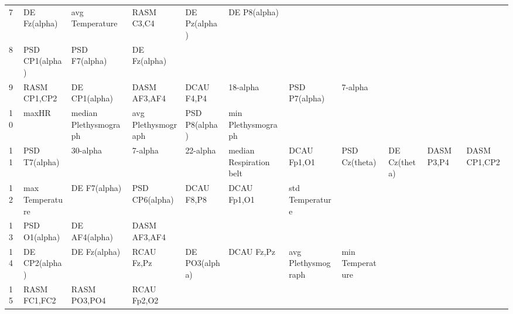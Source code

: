 \begin{landscape}
\begin{table}[]
\begin{tabular}{l|llllllll}
7        & DE Fz(alpha)          & avg Temperature       & RASM C3,C4           & DE Pz(alpha)            & DE P8(alpha)            &                      &                      &                       &                       &                    \\
8        & PSD CP1(alpha)        & PSD F7(alpha)         & DE Fz(alpha)         &                         &                         &                      &                      &                       &                       &                    \\
9        & RASM CP1,CP2          & DE CP1(alpha)         & DASM AF3,AF4         & DCAU F4,P4              & 18-alpha                & PSD P7(alpha)        & 7-alpha              &                       &                       &                    \\
10       & maxHR                 & median Plethysmograph & avg Plethysmograph   & PSD P8(alpha)           & min Plethysmograph      &                      &                      &                       &                       &                    \\
11       & PSD T7(alpha)         & 30-alpha              & 7-alpha              & 22-alpha                & median Respiration belt & DCAU Fp1,O1          & PSD Cz(theta)        & DE Cz(theta)          & DASM P3,P4            & DASM CP1,CP2       \\
12       & max Temperature       & DE F7(alpha)          & PSD CP6(alpha)       & DCAU F8,P8              & DCAU Fp1,O1             & std Temperature      &                      &                       &                       &                    \\
13       & PSD O1(alpha)         & DE AF4(alpha)         & DASM AF3,AF4         &                         &                         &                      &                      &                       &                       &                    \\
14       & DE CP2(alpha)         & DE Fz(alpha)          & RCAU Fz,Pz           & DE PO3(alpha)           & DCAU Fz,Pz              & avg Plethysmograph   & min Temperature      &                       &                       &                    \\
15       & RASM FC1,FC2          & RASM PO3,PO4          & RCAU Fp2,O2          &                         &                         &                      &                      &                       &                       &                    \\

\end{tabular}
\end{table}
\end{landscape}
